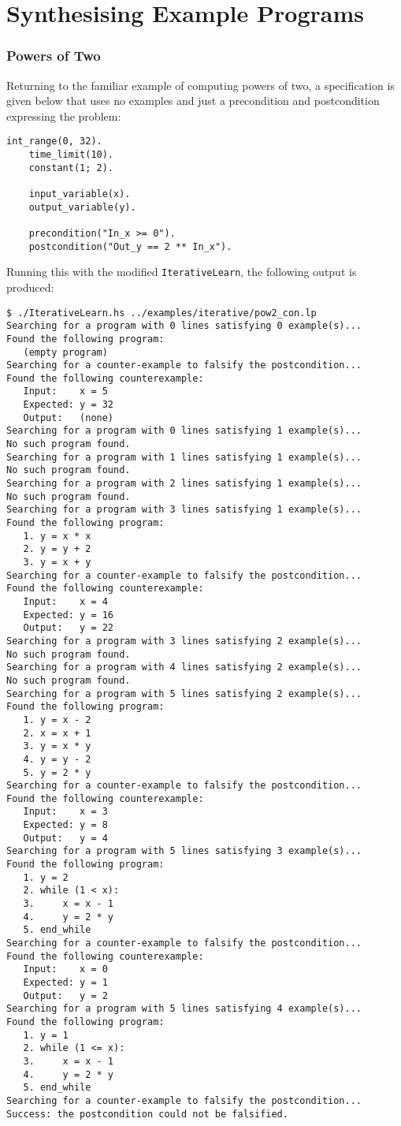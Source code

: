 \documentclass[a4paper,twoside,notitlepage]{report}
\begin{document}
\section{Synthesising Example Programs}

\subsubsection{Powers of Two}
Returning to the familiar example of computing powers of two, a 
specification is given below that uses no examples and just a precondition 
and postcondition expressing the problem:

\begin{Verbatim}[samepage=true]
    int_range(0, 32).
    time_limit(10).
    constant(1; 2).    

    input_variable(x).
    output_variable(y).

    precondition("In_x >= 0").
    postcondition("Out_y == 2 ** In_x").
\end{Verbatim}

Running this with the modified \verb|IterativeLearn|, the following output 
is produced:
\begin{Verbatim}
$ ./IterativeLearn.hs ../examples/iterative/pow2_con.lp 
Searching for a program with 0 lines satisfying 0 example(s)...
Found the following program:
   (empty program)
Searching for a counter-example to falsify the postcondition...
Found the following counterexample:
   Input:    x = 5
   Expected: y = 32
   Output:   (none)
Searching for a program with 0 lines satisfying 1 example(s)...
No such program found.
Searching for a program with 1 lines satisfying 1 example(s)...
No such program found.
Searching for a program with 2 lines satisfying 1 example(s)...
No such program found.
Searching for a program with 3 lines satisfying 1 example(s)...
Found the following program:
   1. y = x * x
   2. y = y + 2
   3. y = x + y
Searching for a counter-example to falsify the postcondition...
Found the following counterexample:
   Input:    x = 4
   Expected: y = 16
   Output:   y = 22
Searching for a program with 3 lines satisfying 2 example(s)...
No such program found.
Searching for a program with 4 lines satisfying 2 example(s)...
No such program found.
Searching for a program with 5 lines satisfying 2 example(s)...
Found the following program:
   1. y = x - 2
   2. x = x + 1
   3. y = x * y
   4. y = y - 2
   5. y = 2 * y
Searching for a counter-example to falsify the postcondition...
Found the following counterexample:
   Input:    x = 3
   Expected: y = 8
   Output:   y = 4
Searching for a program with 5 lines satisfying 3 example(s)...
Found the following program:
   1. y = 2
   2. while (1 < x):
   3.     x = x - 1
   4.     y = 2 * y
   5. end_while
Searching for a counter-example to falsify the postcondition...
Found the following counterexample:
   Input:    x = 0
   Expected: y = 1
   Output:   y = 2
Searching for a program with 5 lines satisfying 4 example(s)...
Found the following program:
   1. y = 1
   2. while (1 <= x):
   3.     x = x - 1
   4.     y = 2 * y
   5. end_while
Searching for a counter-example to falsify the postcondition...
Success: the postcondition could not be falsified.
\end{Verbatim}
\end{document}
